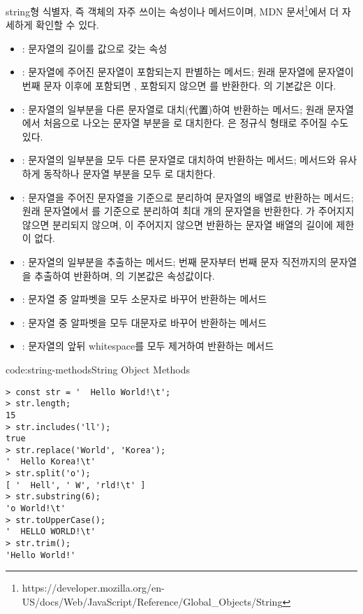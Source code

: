 string형 식별자, 즉  객체의 자주 쓰이는 속성이나 메서드이며, MDN 문서\footnote{https://developer.mozilla.org/en-US/docs/Web/JavaScript/Reference/Global\_Objects/String}에서 더 자세하게 확인할 수 있다.

\begin{itemize}
    \item {}: 문자열의 길이를 값으로 갖는 속성
    \item {}: 문자열에 주어진 문자열이 포함되는지 판별하는 메서드; 원래 문자열에  문자열이 번째 문자 이후에 포함되면 , 포함되지 않으면 를 반환한다. 의 기본값은 이다.
    \item {}: 문자열의 일부분을 다른 문자열로 대치(代置)하여 반환하는 메서드; 원래 문자열에서 처음으로 나오는  문자열 부분을 로 대치한다. 은 정규식 형태로 주어질 수도 있다.
    \item {}: 문자열의 일부분을 모두 다른 문자열로 대치하여 반환하는 메서드;  메서드와 유사하게 동작하나  문자열 부분을 모두 로 대치한다.
    \item {}: 문자열을 주어진 문자열을 기준으로 분리하여 문자열의 배열로 반환하는 메서드; 원래 문자열에서 를 기준으로 분리하여 최대 개의 문자열을 반환한다. 가 주어지지 않으면 분리되지 않으며, 이 주어지지 않으면 반환하는 문자열 배열의 길이에 제한이 없다.
    \item {}: 문자열의 일부분을 추출하는 메서드; 번째 문자부터 번째 문자 직전까지의 문자열을 추출하여 반환하며, 의 기본값은  속성값이다.
    \item {}: 문자열 중 알파벳을 모두 소문자로 바꾸어 반환하는 메서드
    \item {}: 문자열 중 알파벳을 모두 대문자로 바꾸어 반환하는 메서드
    \item {}: 문자열의 앞뒤 whitespace를 모두 제거하여 반환하는 메서드
\end{itemize}

\begin{codeenv}{code:string-methods}{String Object Methods}\begin{verbatim}
> const str = '  Hello World!\t';
> str.length;
15
> str.includes('ll');
true
> str.replace('World', 'Korea');
'  Hello Korea!\t'
> str.split('o');
[ '  Hell', ' W', 'rld!\t' ]
> str.substring(6);
'o World!\t'
> str.toUpperCase();
'  HELLO WORLD!\t'
> str.trim();
'Hello World!'
\end{verbatim}
\end{codeenv}

